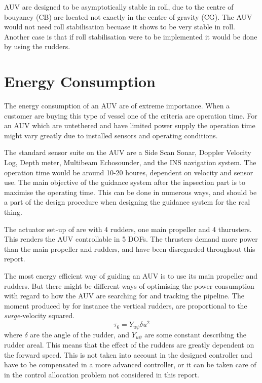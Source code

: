 	\hugin AUV are designed to be
	asymptotically stable in roll, due to the centre of bouyancy (CB) are located not exactly in the centre of
	gravity (CG). The AUV would not need roll stabilisation becuase it shows to be very stable in roll.
	Another case is that if roll stabilisation were to be implemented it would be done by using the
	rudders.


\section{Energy Consumption}
	The energy consumption of an AUV are of extreme importance. When a customer are buying this type of
	vessel one of the criteria are operation time. For an AUV which are untethered and have limited power 
	supply the operation time might vary greatly due to installed sensors and operating conditions.

	The standard sensor suite on the \hugin AUV are a Side Scan Sonar, Doppler Velocity Log, Depth meter,
	Multibeam Echosounder, and the INS navigation system. The operation time would be around 10-20 houres,
	dependent on velocity and sensor use. The main objective of the guidance system after the inpsection
	part is to maximise the operating time. This can be done in numerous ways, and should be a part of the
	design procedure when designing the guidance system for the real thing.

	The actuator set-up of \hugin  are with 4 rudders, one main propeller and 4 thurusters. This renders
	the AUV controllable in 5 DOFs. The thrusters demand more power than the main propeller
	and rudders, and have been disregarded throughout this report. 

	The most energy efficient way of guiding an AUV is to use its main propeller and rudders. But there
	might be different ways of optimising the power consumption with regard to how the AUV are searching
	for and tracking the pipeline. The moment produced by for instance the vertical rudders, are 
	proportional to the \textit{surge-}velocity squared.
		\begin{equation}
			\tau_6 = Y_{u\psi} \delta u^2
		\end{equation}
	where $\delta$ are the angle of the rudder, and $Y_{u \psi}$ are some constant describing the rudder
	areal. This means that the effect of the rudders are greatly dependent on the forward speed. This is
	not taken into account in the designed controller and have to be compensated in a more advanced
	controller, or it can be taken care of in the control allocation problem not considered in this
	report.  

